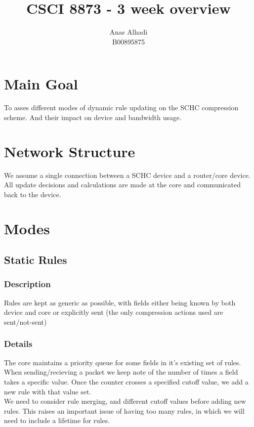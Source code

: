 \documentclass{article}
\title{\textbf{CSCI 8873 -  3 week overview}}
\author{Anas Alhadi\\B00895875}
\numberwithin{equation}{subsection}
\begin{document}
	\maketitle

	\section{Main Goal}
	\par{
		To asses different modes of dynamic rule updating on the SCHC compression scheme. 
		And their impact on device and bandwidth usage.
	}


	\section{Network Structure}
	\par{
		We assume a single connection between a SCHC device and a router/core device. All 
		update decisions and calculations are made at the core and communicated back to the device.
	}

	\vspace{20pt}
	\section{Modes}
	\subsection{Static Rules}
	\subsubsection{Description}
	\par{
		Rules are kept as generic as possible, with fields either being known by both device and core
		or explicitly sent (the only compression actions used are sent/not-sent)
	}

	\subsubsection{Details}
	\par{
		The core maintains a priority queue for some fields in it's existing set of rules.
		When sending/recieving a packet we keep note of the number of times a field takes a specific
		value. Once the counter crosses a specified cutoff value, we add a new rule with that value
		set.\\
		We need to consider rule merging, and different cutoff values before adding new rules. 
		This raises an important issue of having too many rules, in which we will need to include a 
		lifetime for rules.
	}
\end{document}
